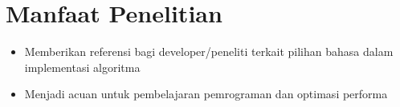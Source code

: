 


\section{Manfaat Penelitian}
\label{sec:manfaat}


\begin{itemize}
	\item Memberikan referensi bagi developer/peneliti terkait pilihan bahasa dalam implementasi algoritma
	\item Menjadi acuan untuk pembelajaran pemrograman dan optimasi performa
\end{itemize}



